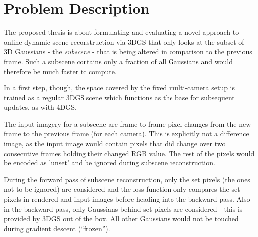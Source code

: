 \section{Problem Description}

The proposed thesis is about formulating and evaluating a novel approach to online dynamic scene reconstruction via 3DGS that only looks at the subset of 3D Gaussians - the \textit{subscene} - that is being altered in comparison to the previous frame. Such a subscene contains only a fraction of all Gaussians and would therefore be much faster to compute.

In a first step, though, the space covered by the fixed multi-camera setup is trained as a regular 3DGS scene which functions as the base for subsequent updates, as with 4DGS.

The input imagery for a subscene are frame-to-frame pixel changes from the new frame to the previous frame (for each camera). This is explicitly not a difference image, as the input image would contain pixels that did change over two consecutive frames holding their changed RGB value. The rest of the pixels would be encoded as 'unset' and be ignored during subscene reconstruction.

During the forward pass of subscene reconstruction, only the set pixels (the ones not to be ignored) are considered and the loss function only compares the set pixels in rendered and input images before heading into the backward pass. Also in the backward pass, only Gaussians behind set pixels are considered - this is provided by 3DGS out of the box. All other Gaussians would not be touched during gradient descent (\enquote{frozen}).\vspace*{1em}

